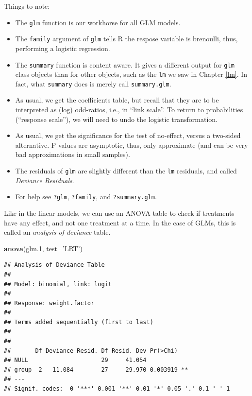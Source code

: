 \documentclass[]{book}
\newenvironment{Shaded}{\begin{snugshade}}{\end{snugshade}}
\newcommand{\DataTypeTok}[1]{\textcolor[rgb]{0.13,0.29,0.53}{#1}}
\newcommand{\FloatTok}[1]{\textcolor[rgb]{0.00,0.00,0.81}{#1}}
\newcommand{\KeywordTok}[1]{\textcolor[rgb]{0.13,0.29,0.53}{\textbf{#1}}}
\newcommand{\NormalTok}[1]{#1}
\newcommand{\StringTok}[1]{\textcolor[rgb]{0.31,0.60,0.02}{#1}}
\providecommand{\tightlist}{%
  \setlength{\itemsep}{0pt}\setlength{\parskip}{0pt}}
\theoremstyle{definition}
\theoremstyle{definition}
\theoremstyle{definition}
\theoremstyle{remark}
\begin{document}
Things to note:

\begin{itemize}
\tightlist
\item
  The \texttt{glm} function is our workhorse for all GLM models.
\item
  The \texttt{family} argument of \texttt{glm} tells R the respose variable is brenoulli, thus, performing a logistic regression.
\item
  The \texttt{summary} function is content aware. It gives a different output for \texttt{glm} class objects than for other objects, such as the \texttt{lm} we saw in Chapter \ref{lm}. In fact, what \texttt{summary} does is merely call \texttt{summary.glm}.
\item
  As usual, we get the coefficients table, but recall that they are to be interpreted as (log) odd-ratios, i.e., in ``link scale''. To return to probabilities (``response scale''), we will need to undo the logistic transformation.
\item
  As usual, we get the significance for the test of no-effect, versus a two-sided alternative. P-values are asymptotic, thus, only approximate (and can be very bad approximations in small samples).
\item
  The residuals of \texttt{glm} are slightly different than the \texttt{lm} residuals, and called \emph{Deviance Residuals}.
\item
  For help see \texttt{?glm}, \texttt{?family}, and \texttt{?summary.glm}.
\end{itemize}

Like in the linear models, we can use an ANOVA table to check if treatments have any effect, and not one treatment at a time.
In the case of GLMs, this is called an \emph{analysis of deviance} table.

\begin{Shaded}
\begin{Highlighting}[]
\KeywordTok{anova}\NormalTok{(glm}\FloatTok{.1}\NormalTok{, }\DataTypeTok{test=}\StringTok{'LRT'}\NormalTok{)}
\end{Highlighting}
\end{Shaded}

\begin{verbatim}
## Analysis of Deviance Table
## 
## Model: binomial, link: logit
## 
## Response: weight.factor
## 
## Terms added sequentially (first to last)
## 
## 
##       Df Deviance Resid. Df Resid. Dev Pr(>Chi)   
## NULL                     29     41.054            
## group  2   11.084        27     29.970 0.003919 **
## ---
## Signif. codes:  0 '***' 0.001 '**' 0.01 '*' 0.05 '.' 0.1 ' ' 1
\end{verbatim}
\end{document}

